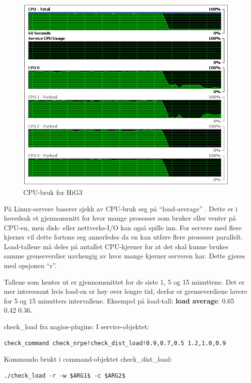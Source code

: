 \begin{figure}[H]
    \centering
    \includegraphics[scale=0.6]{img/HiG3_cpu_graph}
    \caption{CPU-bruk for HiG3}
    \label{cpustrain}
\end{figure}

På Linux-servere baserer sjekk av CPU-bruk seg på ``load-average'' \cite{loadavg, wiki:loadavg}. Dette er i hovedsak et gjennomsnitt for hvor mange prosesser som bruker eller venter på CPU-en, men disk- eller nettverks-I/O kan også spille inn. For servere med flere kjerner vil dette fortone seg annerledes da en kan utføre flere prosesser parallelt. Load-tallene må deles på antallet CPU-kjerner for at det skal kunne brukes samme grenseverdier uavhengig av hvor mange kjerner serveren har. Dette gjøres med opsjonen ``r''.

Tallene som hentes ut er gjennomsnittet for de siste 1, 5 og 15 minuttene. Det er mer interessant hvis load-en er høy over lengre tid, derfor er grenseverdiene lavere for 5 og 15 minutters intervallene. Eksempel på load-tall: {\bf load average}: 0.65 0.42 0.36.

check\_load fra nagios-plugins:
I service-objektet:
\begin{lstlisting}[style=example]
check_command check_nrpe!check_dist_load!0.9,0.7,0.5 1.2,1.0,0.9
\end{lstlisting}
Kommando brukt i command-objektet check\_dist\_load:
\begin{lstlisting}[style=example]
./check_load -r -w $ARG1$ -c $ARG2$
\end{lstlisting}

